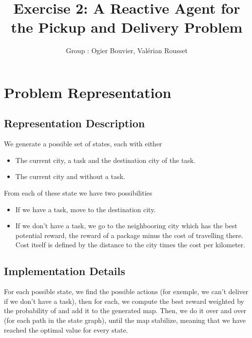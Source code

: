 \documentclass[11pt]{article}
\title{\bf Exercise 2: A Reactive Agent for the Pickup and Delivery Problem}
\author{Group \textnumero 17: Ogier Bouvier, Val\'erian Rousset}
\begin{document}
\maketitle

\section{Problem Representation}

\subsection{Representation Description}

We generate a possible set of states, each with either

\begin{itemize}
	\item The current city, a task and the destination city of the task.
	\item The current city and without a task.
\end{itemize}

From each of these state we have two possibilities

\begin{itemize}
	\item If we have a task, move to the destination city.
	\item If we don't have a task, we go to the neighbooring city which
		has the best potential reward, the reward of a package minus
		the cost of travelling there. Cost itself is defined by the
		distance to the city times the cost per kilometer.
\end{itemize}

\subsection{Implementation Details}

For each possible state, we find the possible actions (for exemple, we can't
deliver if we don't have a task), then for each, we compute the best
reward weighted by the probability of  and add it to the generated
map. Then, we do it over and over (for each path in the state graph),
until the map stabilize, meaning that we have reached the optimal
value for every state.
\end{document}
